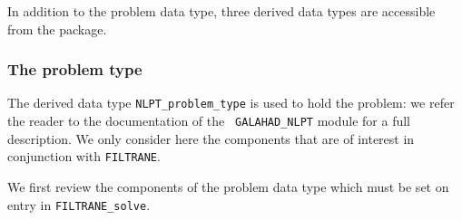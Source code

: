 \documentclass{galahad}
\newcommand{\packagename}{FILTRANE}
\newcommand{\filtrane}{{\tt \packagename}}
\begin{document}

\galtypes

In addition to the problem data type, three derived data types are accessible
from the package.

\subsubsection{The problem type}\label{problem_type_s}

The derived data type {\tt NLPT\_problem\_type} is used to hold 
the problem: we refer the reader to the documentation of the {\tt
GALAHAD\_NLPT} module for a full description. We only consider here the
components that are of interest in conjunction with \filtrane.

\noindent
We first review the components of the problem data type which must be set on
entry in {\tt \packagename\_solve}.
\end{document}
